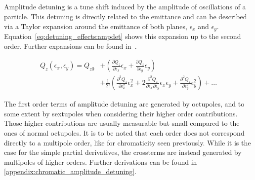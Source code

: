 \subsection{}

Amplitude detuning is a tune shift induced by the amplitude of oscillations of a particle. This
detuning is directly related to the emittance and can be described via a Taylor expansion around the
emittance of both planes, $\epsilon_x$ and $\epsilon_y$.
Equation~\eqref{eq:detuning_effects:ampdet} shows this expansion up to the second order. 
Further expansions can be found in~\cite{dilly_derivation_2023}.

\begin{equation}
\begin{aligned}
Q_z(\epsilon_x, \epsilon_y) = Q_{z0} &+ \left(\frac{\partial Q_z}{\partial \epsilon_x} \epsilon_x
                                                + \frac{\partial Q_z}{\partial \epsilon_y} \epsilon_y
                                                \right) \\
                                     &+ \frac{1}{2!} \left(\frac{\partial^2Q_z}{\partial \epsilon_x^2}\epsilon_x^2 
                                                          + 2 \frac{\partial^2Q_z}{\partial \epsilon_x \partial \epsilon_y}\epsilon_x \epsilon_y
                                                          + \frac{\partial^2Q_z}{\partial \epsilon_y^2}\epsilon_y^2\right)
                                     + ... 
\end{aligned}
\label{eq:detuning_effects:ampdet}
\end{equation}

The first order terms of amplitude detuning are generated by octupoles, and to some extent by
sextupoles when considering their higher order contributions. Those higher contributions are usually
measurable but small compared to the ones of normal octupoles.  
It is to be noted that each order does not correspond directly to a multipole order, like for
chromaticity seen previously. While it is the case for the simple partial derivatives, the
crossterms are instead generated by multipoles of higher orders.
Further derivations can be found in \cref{appendix:chromatic_amplitude_detuning}.



